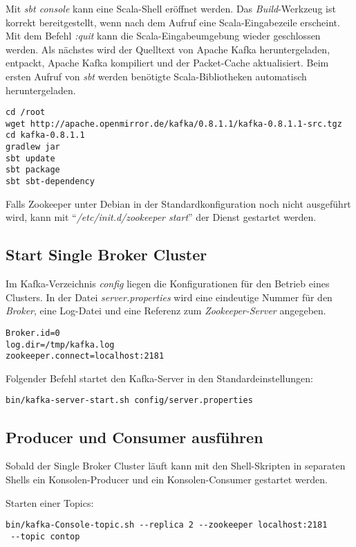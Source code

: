 Mit \textit{sbt console} kann eine Scala-Shell eröffnet werden. Das \textit{Build}-Werkzeug ist korrekt bereitgestellt, wenn nach dem Aufruf eine Scala-Eingabezeile erscheint. Mit dem Befehl \textit{:quit} kann die Scala-Eingabeumgebung wieder geschlossen werden. Als nächstes wird der Quelltext von Apache Kafka heruntergeladen, entpackt, Apache Kafka kompiliert und der Packet-Cache aktualisiert. Beim ersten Aufruf von \textit{sbt} werden benötigte Scala-Bibliotheken automatisch heruntergeladen.

\begin{verbatim}
cd /root
wget http://apache.openmirror.de/kafka/0.8.1.1/kafka-0.8.1.1-src.tgz 
cd kafka-0.8.1.1
gradlew jar
sbt update
sbt package
sbt sbt-dependency
\end{verbatim}

Falls Zookeeper unter Debian in der Standardkonfiguration noch nicht ausgeführt wird, kann mit "`\textit{/etc/init.d/zookeeper start}"' der Dienst gestartet werden.

\subsection{Start Single Broker Cluster}

Im Kafka-Verzeichnis \textit{config} liegen die Konfigurationen für den Betrieb eines Clusters. In der Datei \textit{server.properties} wird eine eindeutige Nummer für den \textit{Broker}, eine Log-Datei und eine Referenz zum \textit{Zookeeper-Server} angegeben.

\begin{verbatim}
Broker.id=0
log.dir=/tmp/kafka.log
zookeeper.connect=localhost:2181
\end{verbatim}

Folgender Befehl startet den Kafka-Server in den Standardeinstellungen:
\begin{verbatim}
bin/kafka-server-start.sh config/server.properties
\end{verbatim}


\subsection{Producer und Consumer ausführen}

Sobald der Single Broker Cluster läuft kann mit den Shell-Skripten in separaten Shells ein Konsolen-Producer und ein Konsolen-Consumer gestartet werden.

Starten einer Topics:
\begin{verbatim}
bin/kafka-Console-topic.sh --replica 2 --zookeeper localhost:2181
 --topic contop
\end{verbatim}

